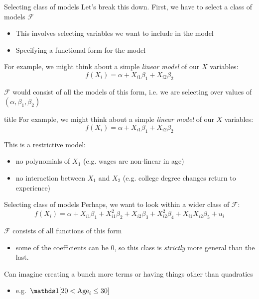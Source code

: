 \documentclass[aspectratio=169,t,11pt,table]{beamer}
\begin{document}
\begin{frame}{Selecting class of models}
  Let's break this down. First, we have to select a class of models $\mathcal{F}$
  \begin{itemize}
    \item This involves selecting variables we want to include in the model
    
    \item Specifying a functional form for the model
  \end{itemize}

  \pause
  \bigskip
  For example, we might think about a simple \emph{linear model} of our $X$ variables:
  $$
    f(X_i) = \alpha + X_{i1} \beta_1 + X_{i2} \beta_2
  $$
  
  $\mathcal{F}$ would consist of all the models of this form, i.e. we are selecting over values of $(\alpha, \beta_1, \beta_2)$
\end{frame}

\begin{frame}{title}
  For example, we might think about a simple \emph{linear model} of our $X$ variables:
  $$
    f(X_i) = \alpha + X_{i1} \beta_1 + X_{i2} \beta_2
  $$


  This is a restrictive model:
  \begin{itemize}
    \item no polynomials of $X_1$ (e.g. wages are non-linear in age)
    \item no interaction between $X_1$ and $X_2$ (e.g. college degree changes return to experience)
  \end{itemize} 
\end{frame}

\begin{frame}{Selecting class of models}
  Perhaps, we want to look within a wider class of $\mathcal{F}$:
  $$
    f(X_i) = \alpha + X_{i1} \beta_1 + X_{i1}^2 \beta_2 + X_{i2} \beta_3 + X_{i2}^2 \beta_4 + X_{i1} X_{i2} \beta_5 + u_i
  $$
 
  \bigskip
  $\mathcal{F}$ consists of all functions of this form
  \begin{itemize}
    \item some of the coefficients can be 0, so this class is \emph{strictly} more general than the last.
  \end{itemize}
  
  \pause
  \bigskip
  Can imagine creating a bunch more terms or having things other than quadratics
  \begin{itemize}
    \item e.g. $\one{20 < \text{Age}_i \leq 30}$
  \end{itemize} 
\end{frame}
\end{document}
